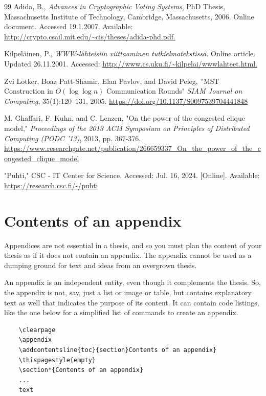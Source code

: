 \documentclass[english, 12pt, a4paper, elec, utf8, a-2b, online]{aaltothesis}
\begin{document}
\begin{thebibliography}{99}
   Adida, B., \textit{Advances in Cryptographic Voting Systems}, 
	PhD Thesis, Massachusetts Institute of Technology, Cambridge, Massachusetts,
	2006. Online document. Accessed 19.1.2007. Available: 
	\url{http://crypto.csail.mit.edu/~cis/theses/adida-phd.pdf.}

   Kilpeläinen, P., 
    \textit{\foreignlanguage{finnish}{WWW-lähteisiin viittaaminen 
    		tutkielmatekstissä}.} Online article. Updated 26.11.2001. 
	Accessed: \url{http://www.cs.uku.fi/~kilpelai/wwwlahteet.html.}


	 Zvi Lotker, Boaz Patt-Shamir, Elan Pavlov, and David Peleg, ”MST Construction in $O(\log{\log{n}})$ Communication Rounds"
	\textit{SIAM Journal on Computing}, 35(1):120–131, 2005.
	\url{https://doi.org/10.1137/S0097539704441848}

	 M. Ghaffari, F. Kuhn, and C. Lenzen, "On the power of the congested clique model," 
	\textit{Proceedings of the 2013 ACM Symposium on Principles of Distributed Computing (PODC '13)}, 2013, pp. 367-376.
	\url{https://www.researchgate.net/publication/266659337_On_the_power_of_the_congested_clique_model}

	 "Puhti," CSC - IT Center for Science, Accessed: Jul. 16, 2024. [Online]. Available: \url{https://research.csc.fi/-/puhti}


\end{thebibliography}

\clearpage

\thesisappendix

\section{Contents of an appendix}
\label{app:contents}

Appendices are not essential in a thesis, and so you must plan the content of 
your thesis as if it does not contain an appendix. The appendix cannot be used 
as a dumping ground for text and ideas from an overgrown thesis.

An appendix is an independent entity, even though it complements the thesis. 
So, the appendix is not, say, just a list or image or table, but contains 
explanatory text as well that indicates the purpose of its content. It can 
contain code listings, like the one below for a simplified list of commands to 
create an appendix.
\begin{verbatim}
	\clearpage
	\appendix
	\addcontentsline{toc}{section}Contents of an appendix}
	\thispagestyle{empty}
	\section*{Contents of an appendix}
	...
	text
\end{verbatim}
\end{document}
